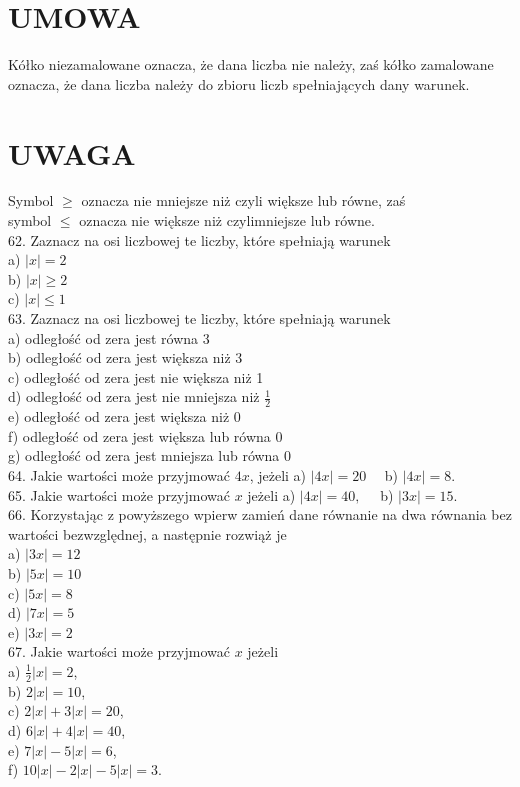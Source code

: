 \documentclass[10pt]{article}
\begin{document}
\section*{UMOWA}
Kółko niezamalowane oznacza, że dana liczba nie należy, zaś kółko zamalowane oznacza, że dana liczba należy do zbioru liczb spełniających dany warunek.

\section*{UWAGA}
Symbol \(\geqslant\) oznacza nie mniejsze niż czyli większe lub równe, zaś\\
symbol \(\leqslant\) oznacza nie większe niż czylimniejsze lub równe.\\
62. Zaznacz na osi liczbowej te liczby, które spełniają warunek\\
a) \(|x|=2\)\\
b) \(|x| \geqslant 2\)\\
c) \(|x| \leqslant 1\)\\
63. Zaznacz na osi liczbowej te liczby, które spełniają warunek\\
a) odległość od zera jest równa 3\\
b) odległość od zera jest większa niż 3\\
c) odległość od zera jest nie większa niż 1\\
d) odległość od zera jest nie mniejsza niż \(\frac{1}{2}\)\\
e) odległość od zera jest większa niż 0\\
f) odległość od zera jest większa lub równa 0\\
g) odległość od zera jest mniejsza lub równa 0\\
64. Jakie wartości może przyjmować \(4 x\), jeżeli a) \(|4 x|=20 \quad\) b) \(|4 x|=8\).\\
65. Jakie wartości może przyjmować \(x\) jeżeli a) \(|4 x|=40, \quad\) b) \(|3 x|=15\).\\
66. Korzystając z powyższego wpierw zamień dane równanie na dwa równania bez wartości bezwzględnej, a następnie rozwiąż je\\
a) \(|3 x|=12\)\\
b) \(|5 x|=10\)\\
c) \(|5 x|=8\)\\
d) \(|7 x|=5\)\\
e) \(|3 x|=2\)\\
67. Jakie wartości może przyjmować \(x\) jeżeli\\
a) \(\frac{1}{2}|x|=2\),\\
b) \(2|x|=10\),\\
c) \(2|x|+3|x|=20\),\\
d) \(6|x|+4|x|=40\),\\
e) \(7|x|-5|x|=6\),\\
f) \(10|x|-2|x|-5|x|=3\).
\end{document}
